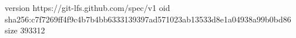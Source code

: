 version https://git-lfs.github.com/spec/v1
oid sha256:c7f7269ff4f9c4b7b4bb6333139397ad571023ab13533d8e1a04938a99b0bd86
size 393312
